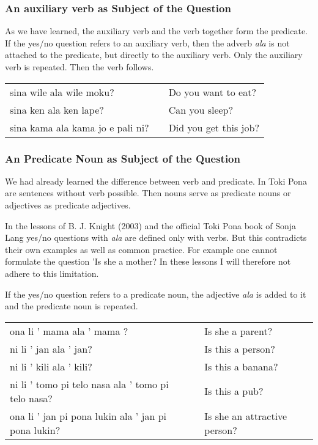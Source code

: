 \subsubsection*{An auxiliary verb as Subject of the Question}
As we have learned, the auxiliary verb and the verb together form the predicate.
If the yes/no question refers to an auxiliary verb, then the adverb \textit{ala} is not attached to the predicate, but directly to the auxiliary verb.
Only the auxiliary verb is repeated.
Then the verb follows.

\begin{supertabular}{p{5,5cm}|ll}
    sina wile ala wile moku?         &  & Do you want to eat?   \\
    sina ken ala ken lape?           &  & Can you sleep?        \\
    sina kama ala kama jo e pali ni? &  & Did you get this job? \\
\end{supertabular}

\subsubsection*{An Predicate Noun as Subject of the Question}
We had already learned the difference between verb and predicate.
In Toki Pona are sentences without verb possible.
Then nouns serve as predicate nouns or adjectives as predicate adjectives.

In the lessons of B. J. Knight (2003) and the official Toki Pona book of Sonja Lang \cite{www:tokipona.org} yes/no questions with \textit{ala} are defined only with verbs.
But this contradicts their own examples as well as common practice.
For example one cannot formulate the question 'Is she a mother?
In these lessons I will therefore not adhere to this limitation.

If the yes/no question refers to a predicate noun, the adjective \textit{ala} is added to it and the predicate noun is repeated.

\begin{supertabular}{p{5,5cm}|ll}
    ona li ' mama ala ' mama ?                          &  & Is she a parent?             \\
    ni li ' jan ala ' jan?                              &  & Is this a person?            \\
    ni li ' kili ala ' kili?                            &  & Is this a banana?            \\
    ni li ' tomo pi telo nasa ala ' tomo pi telo nasa?  &  & Is this a pub?               \\
    ona li ' jan pi pona lukin ala ' jan pi pona lukin? &  & Is she an attractive person? \\
\end{supertabular}

